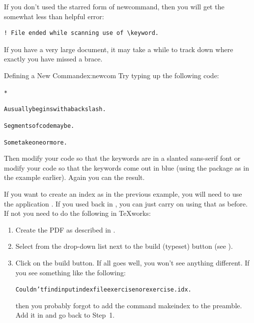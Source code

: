 If you don't used the starred form of \gls{newcommand}, then
you will get the somewhat less than helpful error:
\begin{verbatim}
! File ended while scanning use of \keyword.
\end{verbatim}
If you have a very large document, it may take a while to track
down where exactly you have missed a brace.

\begin{exercise}{Defining a New Command}{ex:newcom}
Try typing up the following code:
\begin{bcode}
\begin{alltt}

*


A  usually begins with a backslash.

Segments of code may be .

Some  take one or more .
\end{alltt}
\end{bcode}

Then modify your code so that the keywords are in a slanted
sans-serif font or modify your code so that the keywords come out in
blue (using the  package as in the example earlier).
Again you can  the result.


If you want to create an index as in the previous example, you will
need to use the application . If you used
 back in , you can just
carry on using that as before. If not you need to do the following
in TeXworks:
\begin{enumerate}
  \item Create the PDF as described in .

  \item Select  from the drop-down list next to the
   build (typeset) button (see ).

  \item Click on the build button. If all goes well, you won't see
    anything different. If you see something like the following:
\begin{alltt}
Couldn't find input index file exercise\theexercise\space nor exercise\theexercise.idx.
\end{alltt}
    then you probably forgot to add the command \gls{makeindex} to
    the preamble. Add it in and go back to Step~1.


\end{enumerate}
\end{exercise}

